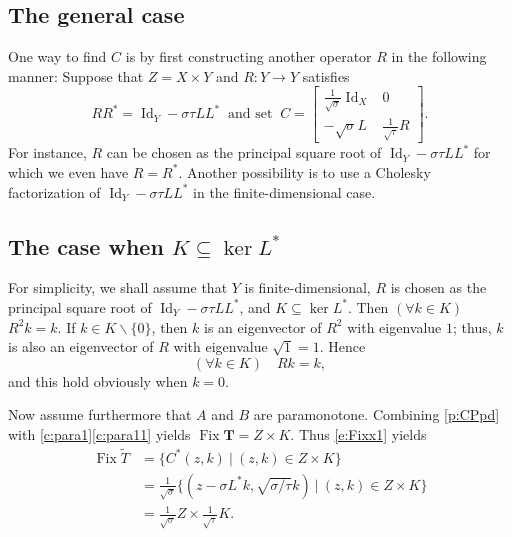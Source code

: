 \documentclass{article}
\newcommand{\menge}[2]{\big\{{#1}~\big |~{#2}\big\}}
\newcommand{\Tt}{\ensuremath{\widetilde{T}}}
\newcommand{\Fix}{\ensuremath{\operatorname{Fix}}}
\newcommand{\Id}{\ensuremath{\operatorname{Id}}}
\newcommand{\bT}{\ensuremath{{\mathbf{T}}}}
\begin{document}
\subsection{The general case}
One way to find $C$ is by first constructing 
another operator $R$ in the following manner: 
Suppose that  $Z=X\times Y$ and $R\colon Y\to Y$ satisfies 
\begin{equation}
\label{e:Roccurs}
RR^* = \Id_Y - \sigma\tau LL^*
\;\;\text{and set}\;\;
C = \begin{bmatrix}
\tfrac{1}{\sqrt{\sigma}}\Id_X & 0 \\
-\sqrt{\sigma}L & \tfrac{1}{\sqrt{\tau}}R
\end{bmatrix}.
\end{equation}
For instance, $R$ can be chosen as the principal square root of 
$\Id_Y-\sigma\tau LL^*$ for which we even have $R=R^*$. 
Another possibility is to use a Cholesky factorization of $\Id_Y-\sigma\tau LL^*$ 
in the finite-dimensional case. 


\subsection{The case when $K\subseteq \ker L^*$}

For simplicity, we shall assume that $Y$ is finite-dimensional, $R$ 
is chosen as the principal square root of $\Id_Y-\sigma\tau LL^*$, 
and $K \subseteq\ker L^*$. 
Then $(\forall k\in K)$ $R^2k = k$. 
If $k\in K\smallsetminus\{0\}$, then 
$k$ is an eigenvector of $R^2$ with eigenvalue $1$; 
thus, $k$ is also an eigenvector of $R$ with eigenvalue
$\sqrt{1}=1$. Hence 
\begin{equation}
(\forall k\in K)\quad  R
k = k,
\end{equation}
and this hold obviously when $k=0$. 

Now assume furthermore that $A$ and $B$ are paramonotone.
Combining \cref{p:CPpd} with \cref{c:para1}\cref{c:para11} 
yields $\Fix \bT = Z\times K$. 
Thus \cref{e:Fixx1} yields 
\begin{subequations}
\begin{align}
\Fix\Tt &= \menge{C^*(z,k)}{(z,k)\in Z\times K}
\\
&= 
\tfrac{1}{\sqrt{\sigma}}\menge{(z-\sigma L^*k,\sqrt{\sigma/\tau}k)}{(z,k)\in Z\times K} \\
&= \tfrac{1}{\sqrt{\sigma}} Z \times \tfrac{1}{\sqrt{\tau}}K.
\end{align}
\end{subequations}
\end{document}
